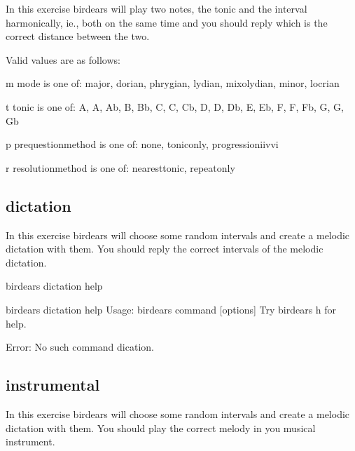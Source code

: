 \documentclass[letterpaper,10pt,english]{sphinxmanual}
\begin{document}
\begin{sphinxVerbatim}[commandchars=\\\{\}]
  In this exercise birdears will play two notes, the tonic and the interval
  harmonically, ie., both on the same time and you should reply which is the
  correct distance between the two.

  Valid values are as follows:

  \PYGZhy{}m \PYGZlt{}mode\PYGZgt{} is one of: major, dorian, phrygian, lydian, mixolydian, minor,
  locrian

  \PYGZhy{}t \PYGZlt{}tonic\PYGZgt{} is one of: A, A\PYGZsh{}, Ab, B, Bb, C, C\PYGZsh{}, Cb, D, D\PYGZsh{}, Db, E, Eb, F,
  F\PYGZsh{}, Fb, G, G\PYGZsh{}, Gb

  \PYGZhy{}p \PYGZlt{}prequestion\PYGZus{}method\PYGZgt{} is one of: none, tonic\PYGZus{}only, progression\PYGZus{}i\PYGZus{}iv\PYGZus{}v\PYGZus{}i

  \PYGZhy{}r \PYGZlt{}resolution\PYGZus{}method\PYGZgt{} is one of: nearest\PYGZus{}tonic, repeat\PYGZus{}only
\end{sphinxVerbatim}


\subsection{dictation}
\label{\detokenize{index:dictation}}
In this exercise birdears will choose some random intervals and create a
melodic dictation with them. You should reply the correct intervals of the
melodic dictation.

\begin{sphinxVerbatim}[commandchars=\\\{\}]
birdears dictation \PYGZhy{}\PYGZhy{}help
\end{sphinxVerbatim}

\begin{sphinxVerbatim}[commandchars=\\\{\}]
\PYGZdl{} birdears dictation \PYGZhy{}\PYGZhy{}help
Usage: birdears  \PYGZlt{}command\PYGZgt{} [options]
Try \PYGZdq{}birdears \PYGZhy{}h\PYGZdq{} for help.

Error: No such command \PYGZdq{}dication\PYGZdq{}.
\end{sphinxVerbatim}


\subsection{instrumental}
\label{\detokenize{index:instrumental}}
In this exercise birdears will choose some random intervals and create a
melodic dictation with them. You should play the correct melody in you
musical instrument.
\end{document}
